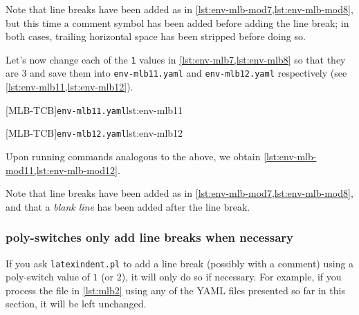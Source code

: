 	Note that line breaks have been added as in \cref{lst:env-mlb-mod7,lst:env-mlb-mod8}, but this time a comment symbol has been added before adding the line break; in both cases, trailing horizontal space has been stripped before doing so.

	Let's  now change each of the \texttt{1} values in \cref{lst:env-mlb7,lst:env-mlb8} so that they are $3$ and save them into \texttt{env-mlb11.yaml} and \texttt{env-mlb12.yaml} respectively (see \cref{lst:env-mlb11,lst:env-mlb12}).

	\begin{minipage}{.49\textwidth}
		[MLB-TCB]{\texttt{env-mlb11.yaml}}{lst:env-mlb11}
	\end{minipage}
	\hfill
	\begin{minipage}{.49\textwidth}
		[MLB-TCB]{\texttt{env-mlb12.yaml}}{lst:env-mlb12}
	\end{minipage}

	Upon running  commands analogous to the above, we obtain \cref{lst:env-mlb-mod11,lst:env-mlb-mod12}.

	\begin{widepage}
		\begin{minipage}{.42\linewidth}
		\end{minipage}
		\hfill
		\begin{minipage}{.57\linewidth}
		\end{minipage}
	\end{widepage}

	Note that line breaks have been added as in \cref{lst:env-mlb-mod7,lst:env-mlb-mod8}, and that a \emph{blank line} has been added after the line break.

\subsubsection{poly-switches only add line breaks when necessary}
	If you ask \texttt{latexindent.pl} to add a line break (possibly with a comment) using a poly-switch value of $1$ (or $2$), it will only do so if necessary.
	For example, if you process the file in \vref{lst:mlb2} using any of the YAML files presented so far in this section, it will be left unchanged.

